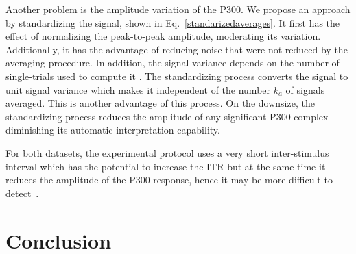\documentclass[entropy,article,submit,moreauthors,pdftex,10pt,a4paper]{mdpi}
\begin{document}


Another problem is the amplitude variation of the P300. We propose an approach by standardizing the signal, shown in Eq.~\ref{standarizedaverages}.  It first has the effect of normalizing the peak-to-peak amplitude, moderating its variation. Additionally,  it has the advantage of reducing noise that were not reduced by the averaging procedure.   In addition, the signal variance depends on the number of single-trials used to compute it \citep{van2006signal}.  The standardizing process converts the signal to unit signal variance which makes it independent of the number $k_a$ of signals averaged.   This is another advantage of this process.  On the downsize, the standardizing process reduces the amplitude of any significant P300 complex diminishing its automatic interpretation capability.

For both datasets, the experimental protocol uses a very short inter-stimulus interval which has the potential to increase the ITR but at the same time it reduces the amplitude of the P300 response, hence it may be more difficult to detect~\citep{Rao2013}.  



%
%
%
%
%
%
%
%

\section{Conclusion}



\end{document}
